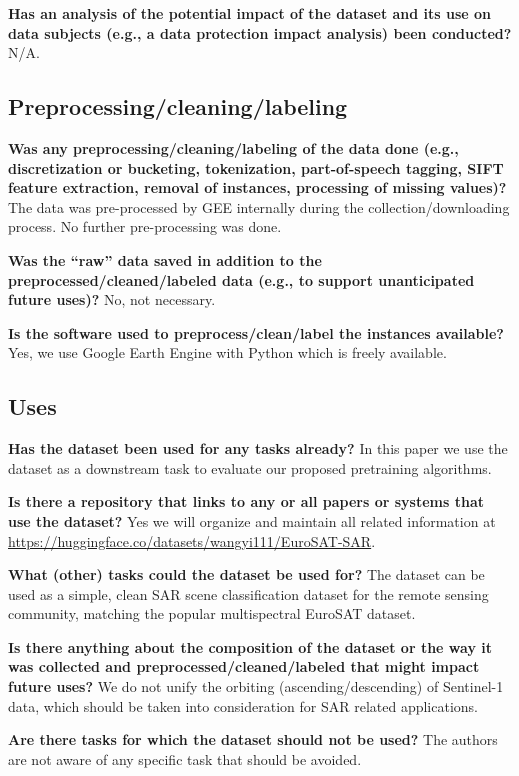 \documentclass[lettersize,journal]{IEEEtran}
\begin{document}
\textbf{Has an analysis of the potential impact of the dataset and its use on data subjects (e.g., a data protection impact analysis) been conducted?} N/A.

\subsection{Preprocessing/cleaning/labeling} 

\textbf{Was any preprocessing/cleaning/labeling of the data done (e.g., discretization or bucketing, tokenization, part-of-speech tagging, SIFT feature extraction, removal of instances, processing of missing values)?} The data was pre-processed by GEE internally during the collection/downloading process. No further pre-processing was done.

\textbf{Was the “raw” data saved in addition to the preprocessed/cleaned/labeled data (e.g., to support unanticipated future uses)?} No, not necessary.

\textbf{Is the software used to preprocess/clean/label the instances available?} Yes, we use Google Earth Engine with Python which is freely available.

\subsection{Uses}

\textbf{Has the dataset been used for any tasks already?} In this paper we use the dataset as a downstream task to evaluate our proposed pretraining algorithms. 

\textbf{Is there a repository that links to any or all papers or systems that use the dataset?} Yes we will organize and maintain all related information at \url{https://huggingface.co/datasets/wangyi111/EuroSAT-SAR}.

\textbf{What (other) tasks could the dataset be used for?} The dataset can be used as a simple, clean SAR scene classification dataset for the remote sensing community, matching the popular multispectral EuroSAT dataset.


\textbf{Is there anything about the composition of the dataset or the way it was collected and preprocessed/cleaned/labeled that might impact future uses?} We do not unify the orbiting (ascending/descending) of Sentinel-1 data, which should be taken into consideration for SAR related applications.

\textbf{Are there tasks for which the dataset should not be used?} The authors are not aware of any specific task that should be avoided.
\end{document}
